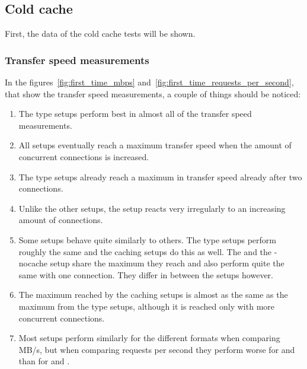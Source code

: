\documentclass[twoside,openright]{uva-bachelor-thesis}
\begin{document}
\subsection{Cold cache}
First, the data of the cold cache tests will be shown.

\subsubsection{Transfer speed measurements}
In the figures~\ref{fig:first_time_mbps}
and~\ref{fig:first_time_requests_per_second}, that show the transfer speed
measurements, a couple of things should be noticed:
\begin{enumerate}
    \item
        The \cdn type setups perform best in almost all of the transfer
        speed measurements.

    \item
        All setups eventually reach a maximum transfer speed when the amount of
        concurrent connections is increased.

    \item
        The \cdn type setups already reach a maximum in transfer speed already
        after two connections.

    \item
        Unlike the other setups, the \ipp setup reacts very irregularly to
        an increasing amount of connections.

    \item
        Some setups behave quite similarly to others. The \cdn type setups perform
        roughly the same and the caching \lt setups do this as well. The \ipp
        and the \lt-nocache setup share the maximum they reach and also perform
        quite the same with one connection. They differ in between the setups
        however.

    \item
        The maximum reached by the caching \lt setups is almost as the same as
        the maximum from the \cdn type setups, although it is reached only with
        more concurrent connections.

    \item
        Most setups perform similarly for the different formats when comparing
        MB/s, but when comparing requests per second they perform worse for \hds
        and \hls than for \dash and \iss.

\end{enumerate}
\end{document}
